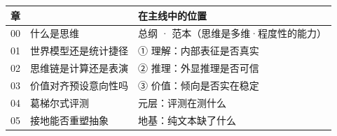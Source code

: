 \documentclass[11pt,a4paper,oneside,fontset=none]{ctexbook}
\begin{document}
\begin{center}\small
\begin{tabular}{@{}ll@{}}
\toprule
\textbf{章} & \textbf{在主线中的位置} \\
\midrule
00　什么是思维 & 总纲 · 范本（思维是多维·程度性的能力）\\
01　世界模型还是统计捷径 & ① 理解：内部表征是否真实 \\
02　思维链是计算还是表演 & ② 推理：外显推理是否可信 \\
03　价值对齐预设意向性吗 & ③ 价值：倾向是否实在稳定 \\
04　葛梯尔式评测 & 元层：评测在测什么 \\
05　接地能否重塑抽象 & 地基：纯文本缺了什么 \\
\bottomrule
\end{tabular}
\end{center}

\vspace{1em}

\tableofcontents

\mainmatter







\end{document}

